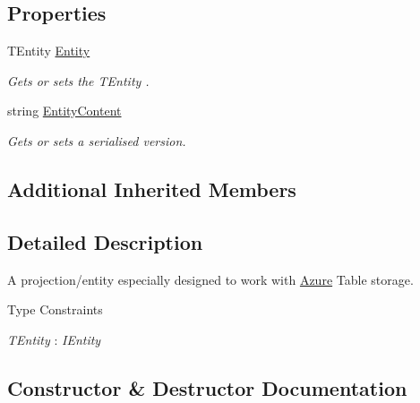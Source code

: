 \subsection*{Properties}
\begin{DoxyCompactItemize}
\item 
T\+Entity \hyperlink{classCqrs_1_1Azure_1_1BlobStorage_1_1EntityTableEntity_ac1f795a5b8c45645ebc71bcde126bcb5_ac1f795a5b8c45645ebc71bcde126bcb5}{Entity}
\begin{DoxyCompactList}\small\item\em Gets or sets the {\itshape T\+Entity} . \end{DoxyCompactList}\item 
string \hyperlink{classCqrs_1_1Azure_1_1BlobStorage_1_1EntityTableEntity_ac6a2c9afc07bb6fae99c0906a408b5b6_ac6a2c9afc07bb6fae99c0906a408b5b6}{Entity\+Content}
\begin{DoxyCompactList}\small\item\em Gets or sets a serialised version. \end{DoxyCompactList}\end{DoxyCompactItemize}
\subsection*{Additional Inherited Members}


\subsection{Detailed Description}
A projection/entity especially designed to work with \hyperlink{namespaceCqrs_1_1Azure}{Azure} Table storage. 

\begin{Desc}
\item[Type Constraints]\begin{description}
\item[{\em T\+Entity} : {\em I\+Entity}]\end{description}
\end{Desc}


\subsection{Constructor \& Destructor Documentation}
\mbox{\label{classCqrs_1_1Azure_1_1BlobStorage_1_1EntityTableEntity_a8d3f730147f5f9b37faeea0840db6a64_a8d3f730147f5f9b37faeea0840db6a64}} 
